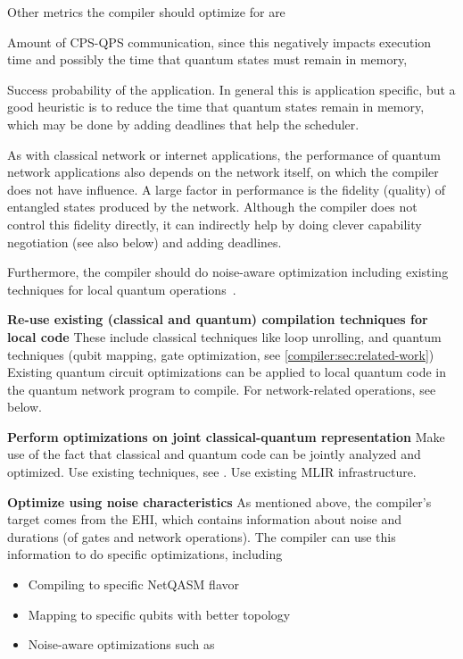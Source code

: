 Other metrics the compiler should optimize for are
\begin{inlinelist}
\item Amount of CPS-QPS communication, since this negatively impacts execution time and possibly the time that quantum states must remain in memory,
\item Success probability of the application. In general this is application specific, but a good heuristic is to reduce the time that quantum states remain in memory, which may be done by adding deadlines that help the scheduler.
\end{inlinelist}

As with classical network or internet applications, the performance of quantum network applications also depends on the network itself, on which the compiler does not have influence.
A large factor in performance is the fidelity (quality) of entangled states produced by the network.
Although the compiler does not control this fidelity directly, it can indirectly help by doing clever capability negotiation (see also below) and adding deadlines.

Furthermore, the compiler should do noise-aware optimization including existing techniques for local quantum operations~\cite{smith_error_2021, murali_noise-adaptive_2019}.


\textbf{Re-use existing (classical and quantum) compilation techniques for local code}
These include classical techniques like loop unrolling, and quantum techniques (qubit mapping, gate optimization, see \cref{compiler:sec:related-work})
Existing quantum circuit optimizations can be applied to local quantum code in the quantum network program to compile.
For network-related operations, see below.

\textbf{Perform optimizations on joint classical-quantum representation}
Make use of the fact that classical and quantum code can be jointly analyzed and optimized.
Use existing techniques, see \cite{mccaskey_mlir_2021, ittah_enabling_2022, nguyen_retargetable_2022, peduri_qssa_2022}.
Use existing \ac{MLIR} infrastructure.

\textbf{Optimize using noise characteristics}
As mentioned above, the compiler's target comes from the \ac{EHI}, which contains information about noise and durations (of gates and network operations).
The compiler can use this information to do specific optimizations, including
\begin{itemize}
  \item Compiling to specific NetQASM flavor
  \item Mapping to specific qubits with better topology
  \item Noise-aware optimizations such as~\cite{smith_error_2021, murali_noise-adaptive_2019}
\end{itemize}



